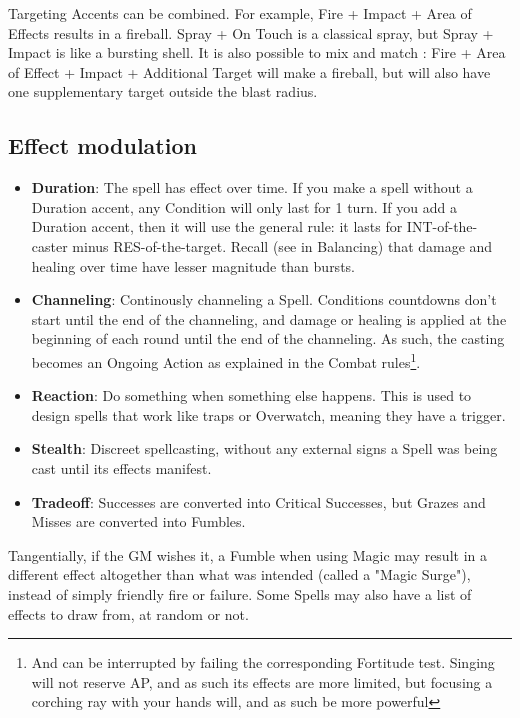 Targeting Accents can be combined. For example, Fire + Impact + Area of Effects results in a fireball. Spray + On Touch is a classical spray, but Spray + Impact is like a bursting shell. It is also possible to mix and match : Fire + Area of Effect + Impact + Additional Target will make a fireball, but will also have one supplementary target outside the blast radius.

\subsection{Effect modulation}

\begin{itemize}
    \item \textbf{Duration}: The spell has effect over time. If you make a spell without a Duration accent, any Condition will only last for 1 turn. If you add a Duration accent, then it will use the general rule: it  lasts for INT-of-the-caster minus RES-of-the-target. Recall (see in Balancing) that damage and healing over time have lesser magnitude than bursts.
    \item \textbf{Channeling}: Continously channeling a Spell. Conditions countdowns don't start until the end of the channeling, and damage or healing is applied at the beginning of each round until the end of the channeling. As such, the casting becomes an Ongoing Action as explained in the Combat rules\footnote{And can be interrupted by failing the corresponding Fortitude test. Singing will not reserve AP, and as such its effects are more limited, but focusing a corching ray with your hands will, and as such be more powerful}.
    \item \textbf{Reaction}: Do something when something else happens. This is used to design spells that work like traps or Overwatch, meaning they have a trigger.
    \item \textbf{Stealth}: Discreet spellcasting, without any external signs a Spell was being cast until its effects manifest.
    \item \textbf{Tradeoff}: Successes are converted into Critical Successes, but Grazes and Misses are converted into Fumbles.    
\end{itemize}

Tangentially, if the GM wishes it, a Fumble when using Magic may result in a different effect altogether than what was intended (called a "Magic Surge"), instead of simply friendly fire or failure. Some Spells may also have a list of effects to draw from, at random or not.


































